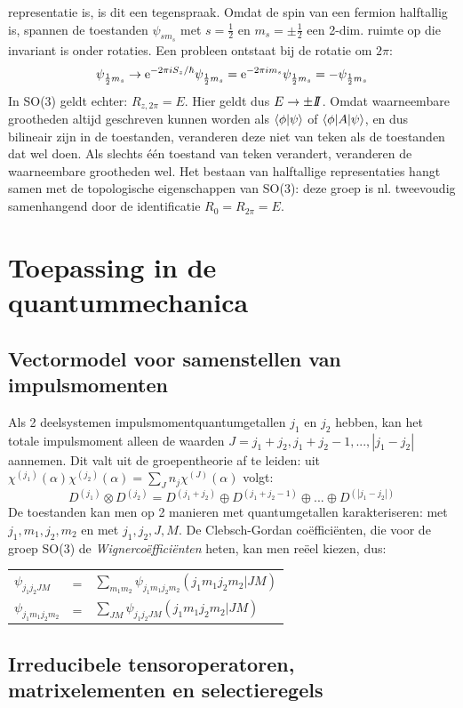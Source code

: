 \documentclass[twoside]{report}
\begin{document}
representatie is, is dit een tegenspraak.
\npar
Omdat de spin van een fermion halftallig is, spannen de toestanden $\psi_{sm_s}$
met $s=\frac{1}{2}$ en $m_s=\pm\frac{1}{2}$ een 2-dim. ruimte op die invariant
is onder rotaties. Een probleen ontstaat bij de rotatie om $2\pi$:
\[
\psi_{\frac{1}{2}m_s}\rightarrow{\rm e}^{-2\pi iS_z/\hbar}\psi_{\frac{1}{2}m_s}
={\rm e}^{-2\pi im_s}\psi_{\frac{1}{2}m_s}=-\psi_{\frac{1}{2}m_s}
\]
In SO(3) geldt echter: $R_{z,2\pi}=E$. Hier geldt dus $E\rightarrow\pm I\hspace{-0.8ex}I$.
Omdat waarneembare grootheden altijd geschreven kunnen worden als
$\left\langle \phi|\psi \right\rangle$ of $\left\langle \phi|A|\psi \right\rangle$, en dus bilineair zijn in de
toestanden, veranderen deze niet van teken als de toestanden dat wel doen.
Als slechts \'e\'en toestand van teken verandert, veranderen de waarneembare
grootheden wel.
\npar
Het bestaan van halftallige representaties hangt samen met de topologische
eigenschappen van SO(3): deze groep is nl. tweevoudig samenhangend door de
identificatie $R_0=R_{2\pi}=E$.

\section{Toepassing in de quantummechanica}
\subsection{Vectormodel voor samenstellen van impulsmomenten}
Als 2 deelsystemen impulsmomentquantumgetallen $j_1$ en $j_2$ hebben, kan het
totale impulsmoment alleen de waarden $J=j_1+j_2,j_1+j_2-1,...,|j_1-j_2|$
aannemen. Dit valt uit de groepentheorie af te leiden: uit
$\chi^{(j_1)}(\alpha)\chi^{(j_2)}(\alpha)=\sum\limits_{J}n_j\chi^{(J)}(\alpha)$
volgt:
\[
D^{(j_1)}\otimes D^{(j_2)}=D^{(j_1+j_2)}\oplus D^{(j_1+j_2-1)}\oplus...\oplus D^{(|j_1-j_2|)}
\]
De toestanden kan men op 2 manieren met quantumgetallen karakteriseren: met
$j_1,m_1,j_2,m_2$ en met $j_1,j_2,J,M$. De Clebsch-Gordan co\"effici\"enten, die
voor de groep SO(3) de {\it Wignerco\"effici\"enten} heten, kan men re\"eel kiezen,
dus:
\begin{tabular}[t]{lcl}
$\psi_{j_1j_2JM}$    &=&$\sum\limits_{m_1m_2}\psi_{j_1m_1j_2m_2}(j_1m_1j_2m_2|JM)$\\
$\psi_{j_1m_1j_2m_2}$&=&$\sum\limits_{JM}\psi_{j_1j_2JM}(j_1m_1j_2m_2|JM)$\\
\end{tabular}

\subsection{Irreducibele tensoroperatoren, matrixelementen en selectieregels}
\end{document}
